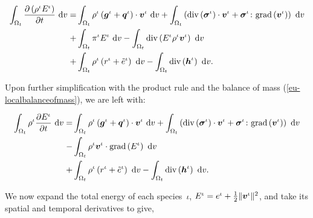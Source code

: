 \begin{equation*}
\begin{split}
\int_{\Omega_{t}} \frac{\partial \left(\rho^{\iota}
  E^{\iota}\right)}{\partial t} \ \mathrm{d}v = & \int_{\Omega_{t}}
\rho^{\iota} \left(\mbox{\boldmath$ g$}^{\iota} +
\mbox{\boldmath$ q$}^{\iota}\right)\cdot\mbox{\boldmath$ v$}^{\iota}\ \mathrm{d}v + \int_{\Omega_{t}}
\left(\mathrm{div}\left(\mbox{\boldmath$\sigma$}^{\iota}\right)\cdot\mbox{\boldmath$ v$}^{\iota} +
\mbox{\boldmath$\sigma$}^{\iota}\colon\mathrm{grad}\left(\mbox{\boldmath$ v$}^{\iota}\right)
\right)\ \mathrm{d}v\\ + & \int_{\Omega_{t}}
\pi^{\iota}E^{\iota}\ \mathrm{d}v - \int_{\Omega_{t}}
\mathrm{div}\left(E^{\iota} \rho^{\iota}
\mbox{\boldmath$ v$}^{\iota}\right)\ \mathrm{d}v \\ + &\int_{\Omega_{t}} \rho^{\iota}
\left(r^{\iota} + \tilde{e}^{\iota} \right)\ \mathrm{d}v -
\int_{\Omega_{t}} \mathrm{div}\left(\mbox{\boldmath$ h$}^{\iota}\right)\ \mathrm{d}v.
\end{split}
\end{equation*}

\noindent Upon further simplification with the product rule and the
balance of mass (\ref{eu-localbalanceofmass}), we are left with:

\begin{equation*}
\begin{split}
\int_{\Omega_{t}} \rho^{\iota} \frac{\partial E^{\iota}}{\partial
  t}\ \mathrm{d}v = & \int_{\Omega_{t}} \rho^{\iota} \left(\mbox{\boldmath$ g$}^{\iota}
+ \mbox{\boldmath$ q$}^{\iota}\right)\cdot\mbox{\boldmath$ v$}^{\iota}\ \mathrm{d}v + \int_{\Omega_{t}}
\left(\mathrm{div}\left(\mbox{\boldmath$\sigma$}^{\iota}\right)\cdot\mbox{\boldmath$ v$}^{\iota} +
\mbox{\boldmath$\sigma$}^{\iota}\colon\mathrm{grad}\left(\mbox{\boldmath$ v$}^{\iota}\right)
\right)\ \mathrm{d}v\\ - & \int_{\Omega_{t}} \rho^{\iota}\mbox{\boldmath$ v$}^{\iota}
\cdot \mathrm{grad}\left( E^{\iota} \right)\ \mathrm{d}v \\ +
&\int_{\Omega_{t}} \rho^{\iota} \left(r^{\iota} + \tilde{e}^{\iota}
\right)\ \mathrm{d}v - \int_{\Omega_{t}}
\mathrm{div}\left(\mbox{\boldmath$ h$}^{\iota}\right)\ \mathrm{d}v.
\end{split}
\end{equation*}

We now expand the total energy of each species~$\iota$, $E^{\iota} =
e^\iota + \frac{1}{2} \Vert\mbox{\boldmath$ v$}^\iota\Vert^2$, and take its spatial and
temporal derivatives to give,

